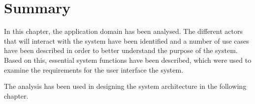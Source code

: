 \section{Summary} \label{ssc:ad_summary}
In this chapter, the application domain has been analysed. The different actors that will interact with the system have been identified and a number of use cases have been described in order to better understand the purpose of the system. Based on this, essential system functions have been described, which were used to examine the requirements for the user interface the system. 
\par
The analysis has been used in designing the system architecture in the following chapter.